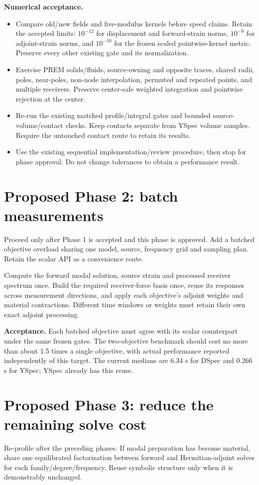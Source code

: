 \documentclass[11pt,a4paper]{article}
\begin{document}
\textbf{Numerical acceptance.}
\begin{itemize}
\item Compare old/new fields and five-modulus kernels before speed claims. Retain the accepted limits: $10^{-12}$ for displacement and forward-strain norms, $10^{-9}$ for adjoint-strain norms, and $10^{-10}$ for the frozen scaled pointwise-kernel metric. Preserve every other existing gate and its normalization.
\item Exercise PREM solids/fluids, source-owning and opposite traces, shared radii, poles, near-poles, non-node interpolation, permuted and repeated points, and multiple receivers. Preserve center-safe weighted integration and pointwise rejection at the center.
\item Re-run the existing matched profile/integral gates and bounded source-volume/contact checks. Keep contacts separate from YSpec volume samples. Require the untouched contact route to retain its results.
\item Use the existing sequential implementation/review procedure, then stop for phase approval. Do not change tolerances to obtain a performance result.
\end{itemize}
\newpage

\section{Proposed Phase 2: batch measurements}
Proceed only after Phase 1 is accepted and this phase is approved. Add a batched objective overload sharing one model, source, frequency grid and sampling plan. Retain the scalar API as a convenience route.

Compute the forward modal solution, source strain and processed receiver spectrum once. Build the required receiver-force basis once, reuse its responses across measurement directions, and apply each objective's adjoint weights and material contractions. Different time windows or weights must retain their own exact adjoint processing.

\textbf{Acceptance.} Each batched objective must agree with its scalar counterpart under the same frozen gates. The two-objective benchmark should cost no more than about 1.5 times a single objective, with actual performance reported independently of this target. The current medians are 6.34 s for DSpec and 0.266 s for YSpec; YSpec already has this reuse.

\section{Proposed Phase 3: reduce the remaining solve cost}
Re-profile after the preceding phases. If modal preparation has become material, share one equilibrated factorization between forward and Hermitian-adjoint solves for each family/degree/frequency. Reuse symbolic structure only when it is demonstrably unchanged.
\end{document}
